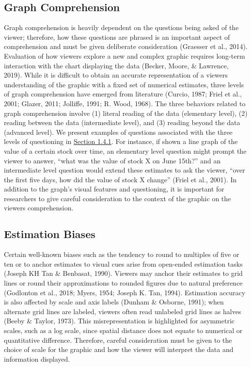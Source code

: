 \documentclass[print]{nuthesis}
\begin{document}
\hypertarget{graph-comprehension-1}{%
\subsection{Graph Comprehension}\label{graph-comprehension-1}}

Graph comprehension is heavily dependent on the questions being asked of the viewer; therefore, how these questions are phrased is an important aspect of comprehension and must be given deliberate consideration (Graesser et al., 2014).
Evaluation of how viewers explore a new and complex graphic requires long-term interaction with the chart displaying the data (Becker, Moore, \& Lawrence, 2019).
While it is difficult to obtain an accurate representation of a viewers understanding of the graphic with a fixed set of numerical estimates, three levels of graph comprehension have emerged from literature (Curcio, 1987; Friel et al., 2001; Glazer, 2011; Jolliffe, 1991; R. Wood, 1968).
The three behaviors related to graph comprehension involve (1) literal reading of the data (elementary level), (2) reading between the data (intermediate level), and (3) reading beyond the data (advanced level).
We present examples of questions associated with the three levels of questioning in \protect\hyperlink{lit-questioning}{Section 1.4.1}.
For instance, if shown a line graph of the value of a certain stock over time, an elementary level question might prompt the viewer to answer, ``what was the value of stock X on June 15th?'' and an intermediate level question would extend these estimates to ask the viewer, ``over the first five days, how did the value of stock X change'' (Friel et al., 2001).
In addition to the graph's visual features and questioning, it is important for researchers to give careful consideration to the context of the graphic on the viewers comprehension.

\hypertarget{estimation-biases-1}{%
\subsection{Estimation Biases}\label{estimation-biases-1}}

Certain well-known biases such as the tendency to round to multiples of five or ten or to anchor estimates to visual cues arise from open-ended estimation tasks (Joseph KH Tan \& Benbasat, 1990).
Viewers may anchor their estimates to grid lines or round their approximations to rounded figures due to natural preference (Godlonton et al., 2018; Myers, 1954; Joseph K. Tan, 1994).
Estimation accuracy is also affected by scale and axis labels (Dunham \& Osborne, 1991); when alternate grid lines are labeled, viewers often read unlabeled grid lines as halves (Beeby \& Taylor, 1973).
This misrepresentation is highlighted for asymmetric scales, such as a log scale, since spatial distance does not equate to numerical or quantitative difference.
Therefore, careful consideration must be given to the choice of scale for the graphic and how the viewer will interpret the data and information displayed.
\end{document}
